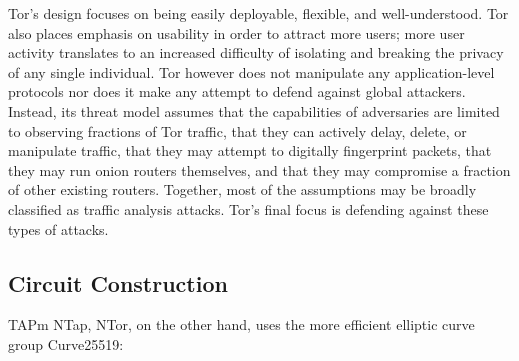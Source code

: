 Tor's design focuses on being easily deployable, flexible, and well-understood. Tor also places emphasis on usability in order to attract more users; more user activity translates to an increased difficulty of isolating and breaking the privacy of any single individual. Tor however does not manipulate any application-level protocols nor does it make any attempt to defend against global attackers. Instead, its threat model assumes that the capabilities of adversaries are limited to observing fractions of Tor traffic, that they can actively delay, delete, or manipulate traffic, that they may attempt to digitally fingerprint packets, that they may run onion routers themselves, and that they may compromise a fraction of other existing routers. Together, most of the assumptions may be broadly classified as traffic analysis attacks. Tor's final focus is defending against these types of attacks.\cite{dingledine2004tor}






\subsection{Circuit Construction}

TAPm \cite{goldberg2006security}
NTap, \cite{goldberg2013anonymity}
NTor, on the other hand, uses the more efficient elliptic curve group Curve25519: \cite{bernstein2006curve25519}









